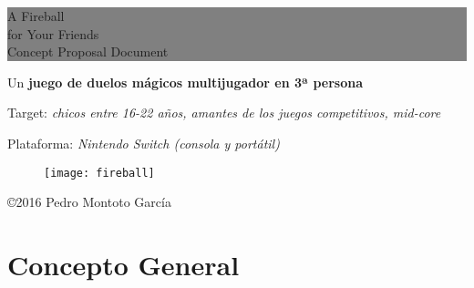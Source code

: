 \documentclass[12pt]{article}
\begin{document}
\pagestyle{empty} %


\colorbox{grey}{
	\parbox[t]{1.0\linewidth}{
		\fontsize{50pt}{30pt}\selectfont %
		\vspace*{0.7cm} %
		
		A Fireball \\ 
		for Your Friends \\ 
        \fontsize{30pt}{34pt}\selectfont
        Concept Proposal Document		
		\par
		
		\vspace*{0.4cm} %
	}
}

\vspace*{0.4cm} 
{\large Un \textbf{juego de duelos mágicos multijugador en 3ª persona}}

\begin{spacing}{0.6}
Target: \textit{chicos entre 16-22 años, amantes de los juegos competitivos, mid-core} 

Plataforma: \textit{Nintendo Switch (consola y portátil)}
\end{spacing}


\begin{figure}[h]
    \centering
    \texttt{[image: fireball]}
\end{figure}

\vfill %

{\centering \hfill \copyright 2016 Pedro Montoto García} \\


\clearpage

\tableofcontents

\cleardoublepage

\setlength{\voffset}{0cm}
\setlength{\parindent}{1cm}

\section{Concepto General}
\pagestyle{fancy}
\setcounter{page}{1}
\end{document}
